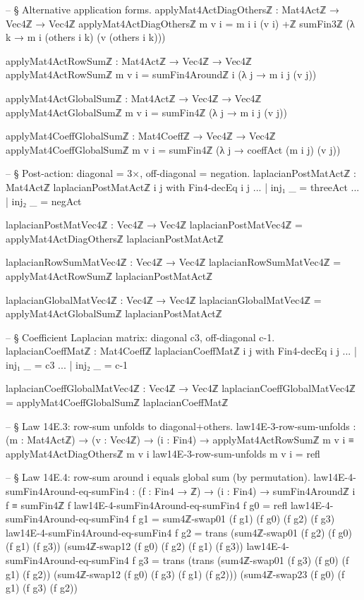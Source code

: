 \documentclass[11pt,a4paper]{book}
\begin{document}
\begin{code}
-- § Alternative application forms.
applyMat4ActDiagOthersℤ : Mat4Actℤ → Vec4ℤ → Vec4ℤ
applyMat4ActDiagOthersℤ m v i =
  m i i (v i) +ℤ
  sumFin3ℤ (λ k → m i (others i k) (v (others i k)))

applyMat4ActRowSumℤ : Mat4Actℤ → Vec4ℤ → Vec4ℤ
applyMat4ActRowSumℤ m v i = sumFin4Aroundℤ i (λ j → m i j (v j))

applyMat4ActGlobalSumℤ : Mat4Actℤ → Vec4ℤ → Vec4ℤ
applyMat4ActGlobalSumℤ m v i = sumFin4ℤ (λ j → m i j (v j))

applyMat4CoeffGlobalSumℤ : Mat4Coeffℤ → Vec4ℤ → Vec4ℤ
applyMat4CoeffGlobalSumℤ m v i = sumFin4ℤ (λ j → coeffAct (m i j) (v j))

-- § Post-action: diagonal = 3×, off-diagonal = negation.
laplacianPostMatActℤ : Mat4Actℤ
laplacianPostMatActℤ i j with Fin4-decEq i j
... | inj₁ _ = threeAct
... | inj₂ _ = negAct

laplacianPostMatVec4ℤ : Vec4ℤ → Vec4ℤ
laplacianPostMatVec4ℤ = applyMat4ActDiagOthersℤ laplacianPostMatActℤ

laplacianRowSumMatVec4ℤ : Vec4ℤ → Vec4ℤ
laplacianRowSumMatVec4ℤ = applyMat4ActRowSumℤ laplacianPostMatActℤ

laplacianGlobalMatVec4ℤ : Vec4ℤ → Vec4ℤ
laplacianGlobalMatVec4ℤ = applyMat4ActGlobalSumℤ laplacianPostMatActℤ

-- § Coefficient Laplacian matrix: diagonal c3, off-diagonal c-1.
laplacianCoeffMatℤ : Mat4Coeffℤ
laplacianCoeffMatℤ i j with Fin4-decEq i j
... | inj₁ _ = c3
... | inj₂ _ = c-1

laplacianCoeffGlobalMatVec4ℤ : Vec4ℤ → Vec4ℤ
laplacianCoeffGlobalMatVec4ℤ = applyMat4CoeffGlobalSumℤ laplacianCoeffMatℤ

-- § Law 14E.3: row-sum unfolds to diagonal+others.
law14E-3-row-sum-unfolds : (m : Mat4Actℤ) → (v : Vec4ℤ) → (i : Fin4) →
  applyMat4ActRowSumℤ m v i ≡ applyMat4ActDiagOthersℤ m v i
law14E-3-row-sum-unfolds m v i = refl

-- § Law 14E.4: row-sum around i equals global sum (by permutation).
law14E-4-sumFin4Around-eq-sumFin4 : (f : Fin4 → ℤ) → (i : Fin4) →
  sumFin4Aroundℤ i f ≡ sumFin4ℤ f
law14E-4-sumFin4Around-eq-sumFin4 f g0 = refl
law14E-4-sumFin4Around-eq-sumFin4 f g1 = sum4ℤ-swap01 (f g1) (f g0) (f g2) (f g3)
law14E-4-sumFin4Around-eq-sumFin4 f g2 =
  trans (sum4ℤ-swap01 (f g2) (f g0) (f g1) (f g3))
        (sum4ℤ-swap12 (f g0) (f g2) (f g1) (f g3))
law14E-4-sumFin4Around-eq-sumFin4 f g3 =
  trans
    (trans (sum4ℤ-swap01 (f g3) (f g0) (f g1) (f g2))
           (sum4ℤ-swap12 (f g0) (f g3) (f g1) (f g2)))
    (sum4ℤ-swap23 (f g0) (f g1) (f g3) (f g2))


\end{code}
\end{document}
